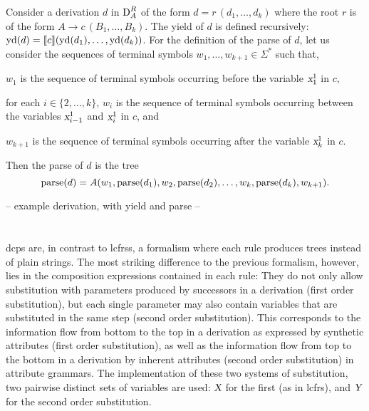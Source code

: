 \documentclass[../document.tex]{subfiles}
\begin{document}
    \begin{definition}
        Consider a derivation \(d\) in \(\operatorname{D}^R_A\) of the form \(d = r\,(d_1, \ldots, d_k)\) where the root \(r\) is of the form \(A \to c\,(B_1, \ldots, B_k)\).
        The yield of \(d\) is defined recursively: \(\operatorname{yd}(d) = \llbracket c\rrbracket(\operatorname{yd}(d_1), \ldots, \operatorname{yd}(d_k))\).
        For the definition of the parse of \(d\), let us consider the sequences of terminal symbols \(w_1, \ldots, w_{k+1} \in \varSigma^*\) such that,
        \begin{compactitem}
            \item \(w_1\) is the sequence of terminal symbols occurring before the variable \(\textsl{x}_1^1\) in \(c\),
            \item for each \(i \in \{2, \ldots, k\}\), \(w_i\) is the sequence of terminal symbols occurring between the variables \(\textsl{x}_{i-1}^1\) and \(\textsl{x}_i^1\) in \(c\), and
            \item \(w_{k+1}\) is the sequence of terminal symbols occurring after the variable \(\textsl{x}_k^1\) in \(c\).
        \end{compactitem}
        Then the parse of \(d\) is the tree \[
        \operatorname{parse}(d) = A(w_1, \operatorname{parse}(d_1), w_2, \operatorname{parse}(d_2), \ldots, w_k, \operatorname{parse}(d_k), w_{k+1}) \text{.}
        \]
    \end{definition}

    \begin{example}
        -- example derivation, with yield and parse --
    \end{example}

    \section{}

    \Glspl{dcp} are, in contrast to \glspl{lcfrs}, a formalism where each rule produces trees instead of plain strings.
    The most striking difference to the previous formalism, however, lies in the composition expressions contained in each rule:
        They do not only allow substitution with parameters produced by successors in a derivation (first order substitution), but each single parameter may also contain variables that are substituted in the same step (second order substitution).
    This corresponds to the information flow from bottom to the top in a derivation as expressed by synthetic attributes (first order substitution), as well as the information flow from top to the bottom in a derivation by inherent attributes (second order substitution) in attribute grammars.
    The implementation of these two systems of substitution, two pairwise distinct sets of variables are used: \(\textsl{X}\) for the first (as in \gls{lcfrs}), and \(\textsl{Y}\) for the second order substitution.
\end{document}
